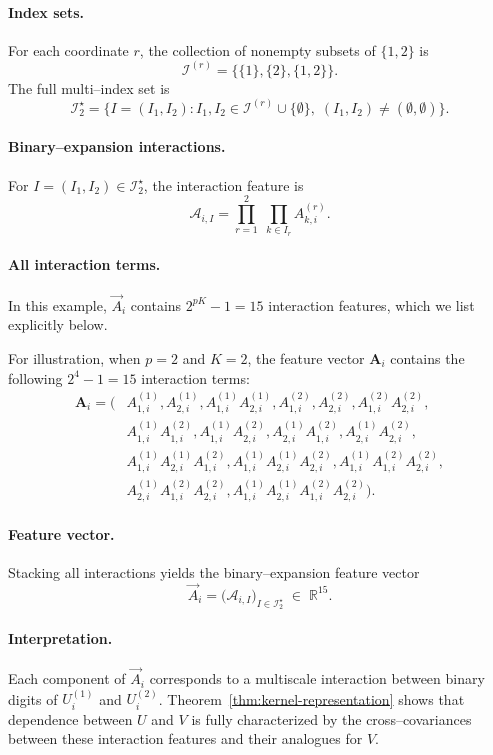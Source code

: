 \documentclass[12pt,reqno,oneside]{amsbook}
\theoremstyle{definition}
\theoremstyle{remark}
\begin{document}
\paragraph{Index sets.}
For each coordinate $r$, the collection of nonempty subsets of
$\{1,2\}$ is
\[
\mathcal I^{(r)} = \bigl\{ \{1\}, \{2\}, \{1,2\} \bigr\}.
\]
The full multi--index set is
\[
\mathcal I_2^\star
=
\bigl\{
I=(I_1,I_2):
I_1,I_2 \in \mathcal I^{(r)} \cup \{\emptyset\},
\;
(I_1,I_2)\neq(\emptyset,\emptyset)
\bigr\}.
\]

\paragraph{Binary--expansion interactions.}
For $I=(I_1,I_2)\in\mathcal I_2^\star$, the interaction feature is
\[
\mathcal A_{i,I}
=
\prod_{r=1}^2 \;
\prod_{k\in I_r} A^{(r)}_{k,i}.
\]

\paragraph{All interaction terms.}
In this example, $\vec A_i$ contains $2^{pK}-1=15$ interaction features,
which we list explicitly below.

For illustration, when $p=2$ and $K=2$, the feature vector $\mathbf A_i$ contains the following $2^{4}-1=15$ interaction terms:
\[
\begin{aligned}
\mathbf A_i
=
(&
A^{(1)}_{1,i},
A^{(1)}_{2,i},
A^{(1)}_{1,i}A^{(1)}_{2,i},
A^{(2)}_{1,i},
A^{(2)}_{2,i},
A^{(2)}_{1,i}A^{(2)}_{2,i},\\
&
A^{(1)}_{1,i}A^{(2)}_{1,i},
A^{(1)}_{1,i}A^{(2)}_{2,i},
A^{(1)}_{2,i}A^{(2)}_{1,i},
A^{(1)}_{2,i}A^{(2)}_{2,i},\\
&
A^{(1)}_{1,i}A^{(1)}_{2,i}A^{(2)}_{1,i},
A^{(1)}_{1,i}A^{(1)}_{2,i}A^{(2)}_{2,i},
A^{(1)}_{1,i}A^{(2)}_{1,i}A^{(2)}_{2,i},\\
&
A^{(1)}_{2,i}A^{(2)}_{1,i}A^{(2)}_{2,i},
A^{(1)}_{1,i}A^{(1)}_{2,i}A^{(2)}_{1,i}A^{(2)}_{2,i}
).
\end{aligned}
\]

\paragraph{Feature vector.}
Stacking all interactions yields the binary--expansion feature vector
\[
\vec A_i
=
\bigl(
\mathcal A_{i,I}
\bigr)_{I\in\mathcal I_2^\star}
\;\in\;
\mathbb R^{15}.
\]

\paragraph{Interpretation.}
Each component of $\vec A_i$ corresponds to a multiscale interaction between
binary digits of $U_i^{(1)}$ and $U_i^{(2)}$. Theorem~\ref{thm:kernel-representation}
shows that dependence between $U$ and $V$ is fully characterized by the
cross--covariances between these interaction features and their analogues for
$V$.
\end{document}
